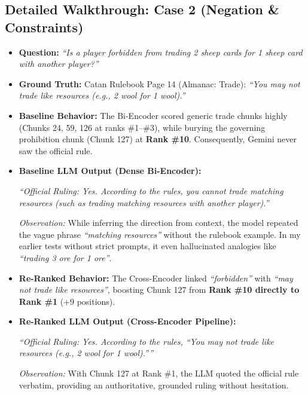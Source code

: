 \documentclass[11pt,a4paper]{article}
\begin{document}
\subsection{Detailed Walkthrough: Case 2 (Negation \& Constraints)}
\begin{itemize}[itemsep=1.2pt,topsep=1.2pt]
    \item \textbf{Question:} \textit{``Is a player forbidden from trading 2 sheep cards for 1 sheep card with another player?''}
    \item \textbf{Ground Truth:} Catan Rulebook Page 14 (Almanac: Trade): \textit{``You may not trade like resources (e.g., 2 wool for 1 wool).''}
    \item \textbf{Baseline Behavior:} The Bi-Encoder scored generic trade chunks highly (Chunks 24, 59, 126 at ranks \#1--\#3), while burying the governing prohibition chunk (Chunk 127) at \textbf{Rank \#10}. Consequently, Gemini never saw the official rule.
    \item \textbf{Baseline LLM Output (Dense Bi-Encoder):}
    \begin{tcolorbox}
    \textit{``Official Ruling: Yes. According to the rules, you cannot trade matching resources (such as trading matching resources with another player).''}
    \end{tcolorbox}
    \textit{Observation:} While inferring the direction from context, the model repeated the vague phrase \textit{``matching resources''} without the rulebook example. In my earlier tests without strict prompts, it even hallucinated analogies like \textit{``trading 3 ore for 1 ore''}.
    \item \textbf{Re-Ranked Behavior:} The Cross-Encoder linked \textit{``forbidden''} with \textit{``may not trade like resources''}, boosting Chunk 127 from \textbf{Rank \#10 directly to Rank \#1} (+9 positions).
    \item \textbf{Re-Ranked LLM Output (Cross-Encoder Pipeline):}
    \begin{tcolorbox}
    \textit{``Official Ruling: Yes. According to the rules, ``You may not trade like resources (e.g., 2 wool for 1 wool).''''}
    \end{tcolorbox}
    \textit{Observation:} With Chunk 127 at Rank \#1, the LLM quoted the official rule verbatim, providing an authoritative, grounded ruling without hesitation.
\end{itemize}

\clearpage
\end{document}
